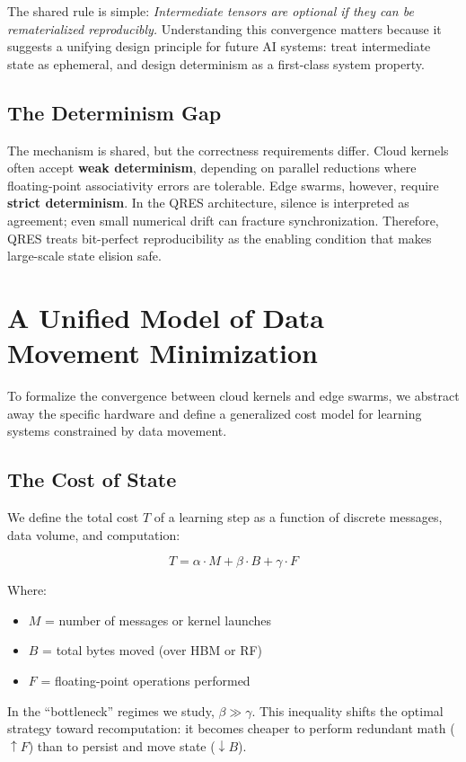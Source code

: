 \documentclass[conference]{IEEEtran}
\begin{document}
The shared rule is simple: \textit{Intermediate tensors are optional if they can be rematerialized reproducibly.} Understanding this convergence matters because it suggests a unifying design principle for future AI systems: treat intermediate state as ephemeral, and design determinism as a first-class system property.

\subsection{The Determinism Gap}
The mechanism is shared, but the correctness requirements differ. Cloud kernels often accept \textbf{weak determinism}, depending on parallel reductions where floating-point associativity errors are tolerable. Edge swarms, however, require \textbf{strict determinism}. In the QRES architecture, silence is interpreted as agreement; even small numerical drift can fracture synchronization. Therefore, QRES treats bit-perfect reproducibility as the enabling condition that makes large-scale state elision safe.

\section{A Unified Model of Data Movement Minimization}
To formalize the convergence between cloud kernels and edge swarms, we abstract away the specific hardware and define a generalized cost model for learning systems constrained by data movement.

\subsection{The Cost of State}
We define the total cost $T$ of a learning step as a function of discrete messages, data volume, and computation:

\begin{equation}
    T = \alpha \cdot M + \beta \cdot B + \gamma \cdot F
\end{equation}

Where:
\begin{itemize}
    \item $M$ = number of messages or kernel launches
    \item $B$ = total bytes moved (over HBM or RF)
    \item $F$ = floating-point operations performed
\end{itemize}

In the ``bottleneck'' regimes we study, $\beta \gg \gamma$. This inequality shifts the optimal strategy toward recomputation: it becomes cheaper to perform redundant math ($\uparrow F$) than to persist and move state ($\downarrow B$).
\end{document}
